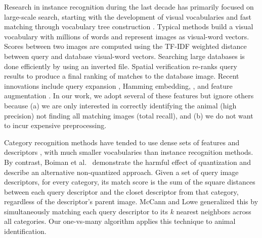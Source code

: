 Research in instance recognition during the last decade has primarily
focused on large-scale search, starting with the development of visual
vocabularies \cite{iccv03SivicZissermanVideoGoogle} and fast matching
through vocabulary tree construction
\cite{cvpr06NisterSteweniusVocabTree}.  Typical
methods \cite{cvpr07PhilbinObjRetriev} build a visual vocabulary with
millions of words and represent images as visual-word vectors.
Scores between two images are computed using the TF-IDF
\cite{iccv03SivicZissermanVideoGoogle} weighted distance between
query and database visual-word vectors.  Searching large databases is
done efficiently by using an inverted file.  Spatial
verification re-ranks query results to produce a final
ranking of matches to the database image.  Recent innovations include
query expansion \cite{cvpr12ChumTotalRecallII}, Hamming
embedding, \cite{ijcv09JegouDouzeSchmidImprovBOF}, and feature augmentation
\cite{cvpr12ArandjelovicThreeThings}.
In our work, we adopt several of these features but ignore others
because (a) we are only interested in correctly identifying the animal (high precision) not
finding all matching images (total recall), and (b) we do not want to incur expensive preprocessing.

Category recognition methods have
tended to use dense sets of features and descriptors \cite{cvpr06SchmidBeyondBOF}, with
much smaller vocabularies than instance recognition methods.
By contrast, Boiman et al.\ \cite{cvpr08BoimanInDefenseNN} demonstrate the harmful
effect of quantization and describe an alternative non-quantized
approach. Given a set of query image descriptors, for every category, its match score is the sum of the square distances
between each query descriptor and the closet descriptor from that category, regardless of the
descriptor's parent image.
McCann and Lowe \cite{cvpr11McCannLNBNN} generalized this by simultaneously matching
each query descriptor to its $k$ nearest neighbors across all categories.  Our
one-vs-many algorithm applies this technique to animal
identification.
